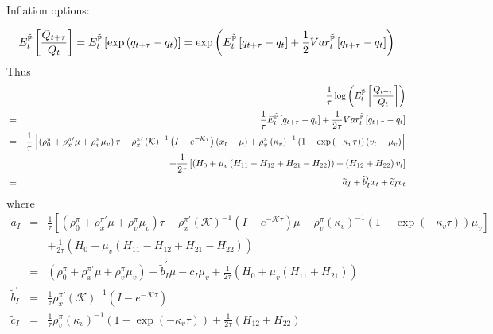 \documentclass{article}
\begin{document}
Inflation options:

\begin{equation*}
E_{t}^{\mathbb{\tilde{P}}}\left[ \frac{Q_{t+\tau }}{Q_{t}}\right] =E_{t}^{%
\mathbb{\tilde{P}}}\left[ \exp \left( q_{t+\tau }-q_{t}\right) \right] =\exp
\left( E_{t}^{\mathbb{\tilde{P}}}\left[ q_{t+\tau }-q_{t}\right] +\frac{1}{2}%
Var_{t}^{\mathbb{\tilde{P}}}\left[ q_{t+\tau }-q_{t}\right] \right)
\end{equation*}%
Thus%
\begin{eqnarray*}
&&\frac{1}{\tau }\log \left( E_{t}^{\mathbb{\tilde{P}}}\left[ \frac{%
Q_{t+\tau }}{Q_{t}}\right] \right) \\
&=&\frac{1}{\tau }E_{t}^{\mathbb{\tilde{P}}}\left[ q_{t+\tau }-q_{t}\right] +%
\frac{1}{2\tau }Var_{t}^{\mathbb{\tilde{P}}}\left[ q_{t+\tau }-q_{t}\right]
\\
&=&\frac{1}{\tau }\left[ \left( \rho _{0}^{\pi }+\rho _{x}^{\pi \prime }\mu
+\rho _{v}^{\pi }\mu _{v}\right) \tau +\rho _{x}^{\pi \prime }\left( 
\mathcal{K}\right) ^{-1}\left( I-e^{-\mathcal{K}\tau }\right) \left(
x_{t}-\mu \right) +\rho _{v}^{\pi }\left( \kappa _{v}\right) ^{-1}\left(
1-\exp \left( -\kappa _{v}\tau \right) \right) \left( v_{t}-\mu _{v}\right) %
\right] \\
&&+\frac{1}{2\tau }\left[ \left( H_{0}+\mu _{v}\left(
H_{11}-H_{12}+H_{21}-H_{22}\right) \right) +\left( H_{12}+H_{22}\right) v_{t}%
\right] \\
&\equiv &\widetilde{a}_{I}+\widetilde{b}_{I}^{\prime }x_{t}+\widetilde{c}%
_{I}v_{t}
\end{eqnarray*}%
where%
\begin{eqnarray*}
\widetilde{a}_{I} &=&\frac{1}{\tau }\left[ \left( \rho _{0}^{\pi }+\rho
_{x}^{\pi \prime }\mu +\rho _{v}^{\pi }\mu _{v}\right) \tau -\rho _{x}^{\pi
\prime }\left( \mathcal{K}\right) ^{-1}\left( I-e^{-\mathcal{K}\tau }\right)
\mu -\rho _{v}^{\pi }\left( \kappa _{v}\right) ^{-1}\left( 1-\exp \left(
-\kappa _{v}\tau \right) \right) \mu _{v}\right] \\
&&+\frac{1}{2\tau }\left( H_{0}+\mu _{v}\left(
H_{11}-H_{12}+H_{21}-H_{22}\right) \right) \\
&=&\left( \rho _{0}^{\pi }+\rho _{x}^{\pi \prime }\mu +\rho _{v}^{\pi }\mu
_{v}\right) -\widetilde{b}_{I}^{\prime }\mu -c_{I}\mu _{v}+\frac{1}{2\tau }%
\left( H_{0}+\mu _{v}\left( H_{11}+H_{21}\right) \right) \\
\widetilde{b}_{I}^{\prime } &=&\frac{1}{\tau }\rho _{x}^{\pi \prime }\left( 
\mathcal{K}\right) ^{-1}\left( I-e^{-\mathcal{K}\tau }\right) \\
\widetilde{c}_{I} &=&\frac{1}{\tau }\rho _{v}^{\pi }\left( \kappa
_{v}\right) ^{-1}\left( 1-\exp \left( -\kappa _{v}\tau \right) \right) +%
\frac{1}{2\tau }\left( H_{12}+H_{22}\right)
\end{eqnarray*}
\end{document}
